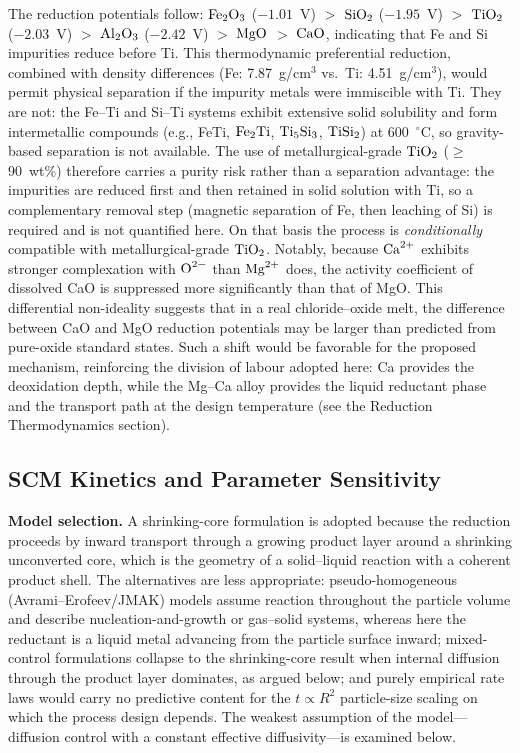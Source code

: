 \documentclass[pdflatex,sn-basic,Numbered]{sn-jnl}
\begin{document}
The reduction potentials follow: $\ce{Fe2O3}$ ($-1.01$~V) $>$ $\ce{SiO2}$ ($-1.95$~V) $>$ $\ce{TiO2}$ ($-2.03$~V) $>$ $\ce{Al2O3}$ ($-2.42$~V) $>$ $\ce{MgO}$ $>$ $\ce{CaO}$, indicating that Fe and Si impurities reduce before Ti. This thermodynamic preferential reduction, combined with density differences (Fe: 7.87~g/cm$^3$ vs.\ Ti: 4.51~g/cm$^3$), would permit physical separation if the impurity metals were immiscible with Ti. They are not: the Fe--Ti and Si--Ti systems exhibit extensive solid solubility and form intermetallic compounds (e.g., FeTi, $\ce{Fe2Ti}$, $\ce{Ti5Si3}$, $\ce{TiSi2}$) at 600~$^{\circ}$C, so gravity-based separation is not available. The use of metallurgical-grade $\ce{TiO2}$ ($\geq$90~wt\%) therefore carries a purity risk rather than a separation advantage: the impurities are reduced first and then retained in solid solution with Ti, so a complementary removal step (magnetic separation of Fe, then leaching of Si) is required and is not quantified here. On that basis the process is \emph{conditionally} compatible with metallurgical-grade $\ce{TiO2}$. Notably, because $\ce{Ca^{2+}}$ exhibits stronger complexation with $\ce{O^{2-}}$ than $\ce{Mg^{2+}}$ does, the activity coefficient of dissolved CaO is suppressed more significantly than that of MgO. This differential non-ideality suggests that in a real chloride--oxide melt, the difference between CaO and MgO reduction potentials may be larger than predicted from pure-oxide standard states. Such a shift would be favorable for the proposed mechanism, reinforcing the division of labour adopted here: Ca provides the deoxidation depth, while the Mg--Ca alloy provides the liquid reductant phase and the transport path at the design temperature (see the Reduction Thermodynamics section).

\subsection{SCM Kinetics and Parameter Sensitivity}
\label{subsec:scm}

\textbf{Model selection.} A shrinking-core formulation is adopted because the reduction proceeds by inward transport through a growing product layer around a shrinking unconverted core, which is the geometry of a solid--liquid reaction with a coherent product shell. The alternatives are less appropriate: pseudo-homogeneous (Avrami--Erofeev/JMAK) models assume reaction throughout the particle volume and describe nucleation-and-growth or gas--solid systems, whereas here the reductant is a liquid metal advancing from the particle surface inward; mixed-control formulations collapse to the shrinking-core result when internal diffusion through the product layer dominates, as argued below; and purely empirical rate laws would carry no predictive content for the $t \propto R^2$ particle-size scaling on which the process design depends. The weakest assumption of the model---diffusion control with a constant effective diffusivity---is examined below.
\end{document}
